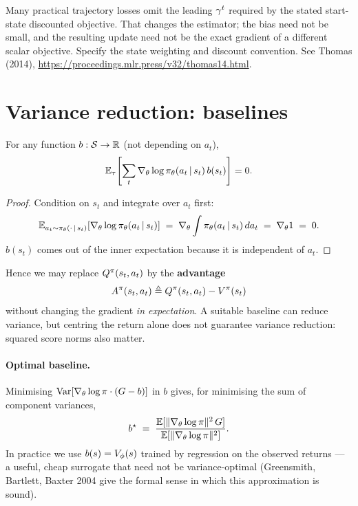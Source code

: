 \documentclass[11pt,oneside]{scrbook}
\begin{document}
\begin{pitfall}
Many practical trajectory losses omit the leading $\gamma^t$ required by
the stated start-state discounted objective. That changes the estimator;
the bias need not be small, and the resulting update need not be the
exact gradient of a different scalar objective. Specify the state weighting
and discount convention. See Thomas (2014),
\url{https://proceedings.mlr.press/v32/thomas14.html}.

\end{pitfall}

\section{Variance reduction: baselines}

\begin{theorem}
For any function $b: \mathcal{S} \to \mathbb{R}$ (not depending on $a_t$),
\[
  \mathbb{E}_\tau\!\left[\sum_t \nabla_\theta \log \pi_\theta(a_t\,\vert\, s_t)\, b(s_t)\right] = 0.
\]
\end{theorem}

\begin{proof}
Condition on $s_t$ and integrate over $a_t$ first:
\[
  \mathbb{E}_{a_t\sim\pi_\theta(\cdot\,\vert\, s_t)}\!\left[\nabla_\theta \log \pi_\theta(a_t\,\vert\, s_t)\right]
  \;=\; \nabla_\theta \int \pi_\theta(a_t\,\vert\, s_t)\, da_t \;=\; \nabla_\theta 1 \;=\; 0.
\]
$b(s_t)$ comes out of the inner expectation because it is independent of $a_t$.
\end{proof}

Hence we may replace $Q^{\pi}(s_t,a_t)$ by the \textbf{advantage}
\[
  A^\pi(s_t,a_t) \triangleq Q^\pi(s_t,a_t) - V^\pi(s_t)
\]
without changing the gradient \emph{in expectation}. A suitable baseline can reduce variance, but centring the return alone
does not guarantee variance reduction: squared score norms also matter.

\paragraph{Optimal baseline.} Minimising $\operatorname{Var}[\nabla_\theta \log \pi \cdot (G - b)]$ in $b$ gives, for minimising the sum of component variances,
\[
  b^\star \;=\; \frac{\mathbb{E}[\|\nabla_\theta \log \pi\|^2\, G]}{\mathbb{E}[\|\nabla_\theta \log \pi\|^2]}.
\]
In practice we use $b(s) = V_\phi(s)$ trained by regression on the observed returns --- a useful, cheap surrogate that need not be variance-optimal (Greensmith, Bartlett, Baxter 2004 give the formal sense in which this approximation is sound).
\end{document}
